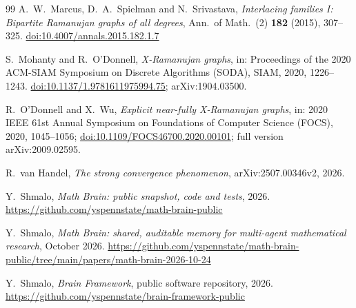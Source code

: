 \documentclass[11pt]{article}
\theoremstyle{remark}
\providecommand{\doi}[1]{\href{https://doi.org/#1}{doi:#1}}
\begin{document}
\begin{thebibliography}{99}
A.~W.~Marcus, D.~A.~Spielman and N.~Srivastava,
\emph{Interlacing families I: Bipartite Ramanujan graphs of all degrees},
Ann.\ of Math.\ (2) \textbf{182} (2015), 307--325.
\doi{10.4007/annals.2015.182.1.7}

S.~Mohanty and R.~O'Donnell,
\emph{X-Ramanujan graphs},
in: Proceedings of the 2020 ACM-SIAM Symposium on Discrete Algorithms (SODA), SIAM, 2020, 1226--1243.
\doi{10.1137/1.9781611975994.75}; arXiv:1904.03500.

R.~O'Donnell and X.~Wu,
\emph{Explicit near-fully X-Ramanujan graphs},
in: 2020 IEEE 61st Annual Symposium on Foundations of Computer Science (FOCS), 2020, 1045--1056;
\doi{10.1109/FOCS46700.2020.00101}; full version arXiv:2009.02595.

R.~van Handel,
\emph{The strong convergence phenomenon},
arXiv:2507.00346v2, 2026.

Y.~Shmalo, \emph{Math Brain: public snapshot, code and tests}, 2026.
\url{https://github.com/yspennstate/math-brain-public}

Y.~Shmalo, \emph{Math Brain: shared, auditable memory for multi-agent mathematical research}, October 2026.
\url{https://github.com/yspennstate/math-brain-public/tree/main/papers/math-brain-2026-10-24}

Y.~Shmalo, \emph{Brain Framework}, public software repository, 2026.
\url{https://github.com/yspennstate/brain-framework-public}

\end{thebibliography}
\end{document}
